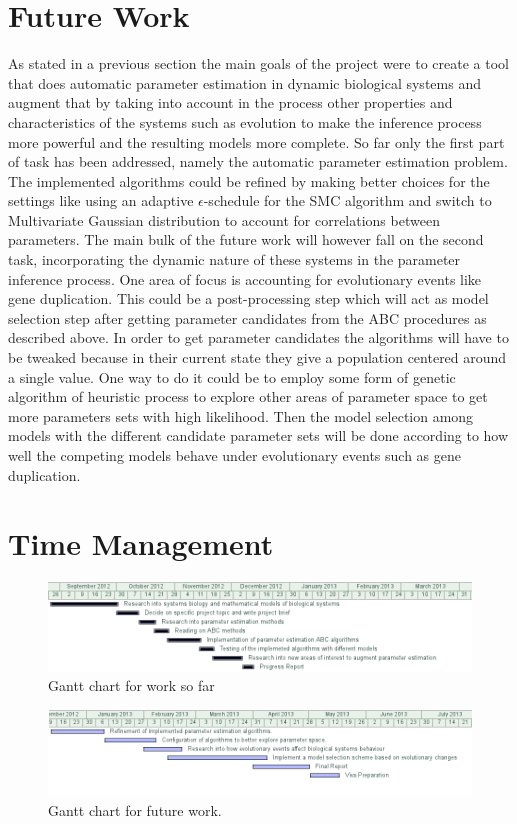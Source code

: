 \documentclass[12pt,a4paper,titlepage]{article}
\begin{document}
\section{Future Work}
As stated in a previous section the main goals of the project were to create a tool that does automatic parameter estimation in dynamic biological systems and augment that by taking into account in the process other properties and characteristics of the systems such as evolution to make the inference process more powerful and the resulting models more complete. So far only the first part of task has been addressed, namely the automatic parameter estimation problem. The implemented algorithms could be refined by making better choices for the settings like using an adaptive $\epsilon$-schedule for the SMC algorithm and switch to Multivariate Gaussian distribution to account for correlations between parameters. 	The main bulk of the future work will however fall on the second task, incorporating the dynamic nature of these systems in the parameter inference process. One area of focus is accounting for evolutionary events like gene duplication. This could be a post-processing step which will act as model selection step after getting parameter candidates from the ABC procedures as described above. In order to get parameter candidates the algorithms will have to be tweaked because in their current state they give a population centered around a single value. One way to do it could be to employ some form of genetic algorithm of heuristic process to explore other areas of parameter space to get more parameters sets with high  likelihood. Then the model selection among models with the different candidate parameter sets will be done according to how well the competing models behave under evolutionary events such as gene duplication.

\appendix
\section{Time Management}
\begin{figure}[H]
\centering
\includegraphics[scale=0.5]{gantt1}
\caption{Gantt chart for work so far}
\end{figure}
\begin{figure}[H]
\centering
\includegraphics[scale=0.5]{gantt2}
\caption{Gantt chart for future work.}
\end{figure}
\end{document}
